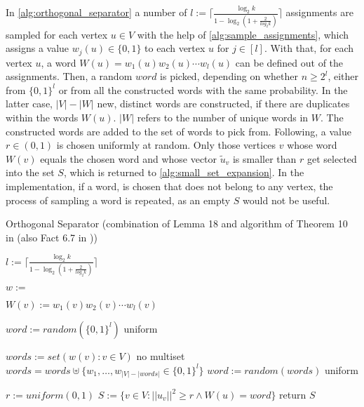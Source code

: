 In \cref{alg:orthogonal_separator} a number of $l := \lceil \frac{\log_2 k}{1-\log_2 (1+\frac{2}{log_2 k})}\rceil$ assignments are sampled for each vertex $u \in V$ with the help of \cref{alg:sample_assignments}, which assigns a value $w_j(u) \in \{0,1\}$ to each vertex $u$ for $j \in [l]$. With that, for each vertex $u$, a word $W(u) =  w_1(u)w_2(u)\cdots w_l(u)$ can be defined out of the assignments. Then, a random $word$ is picked, depending on whether $n\ge 2^l$, either from $\{0,1\}^l$ or from all the constructed words with the same probability. In the latter case, $|V|-|W| $ new, distinct words are constructed, if there are duplicates within the words $W(u)$. $|W|$ refers to the number of unique words in $W$. The constructed words are added to the set of words to pick from. Following, a value $r\in(0,1)$ is chosen uniformly at random. Only those vertices $v$ whose word $W(v)$ equals the chosen word and whose vector $\tilde{u}_v$ is smaller than $r$ get selected into the set $S$, which is returned to \cref{alg:small_set_expansion}. In the implementation, if a word, is chosen that does not belong to any vertex, the process of sampling a word is repeated, as an empty $S$ would not be useful.

\begin{algorithm}[htpb]
\caption{Orthogonal Separator (combination of Lemma 18 and algorithm of Theorem 10 in \cite{LouisM14} (also Fact 6.7 in \cite{ChanLTZ16})) \label{alg:orthogonal_separator}} 

\begin{algorithmic}
	\State $l := \lceil \frac{\log_2 k}{1-\log_2 (1+\frac{2}{log_2 k})}\rceil$


	
	\State $w := $
	
	\State $W(v) := w_1(v)w_2(v)\cdots w_l(v)$
	\EndFor
	
	\State $word := random( \{0,1\}^l)$ \Comment uniform
	
	\Else
	 
	\State $words := set({w(v): v\in V})$ \Comment no multiset
	\State $words = words \uplus \{w_1, \ldots , w_{|V|-|words|} \in \{0,1\}^l\} $ 
	\State $word := random(words)$ \Comment uniform
	
	\EndIf
	
	\State $r := uniform(0,1)$
	\State $S := \{v \in V: ||u_v||^2 \ge r \land W(u) = word \}$
	\State return $S$
	
	\EndFunction %
\end{algorithmic}
\end{algorithm}	

